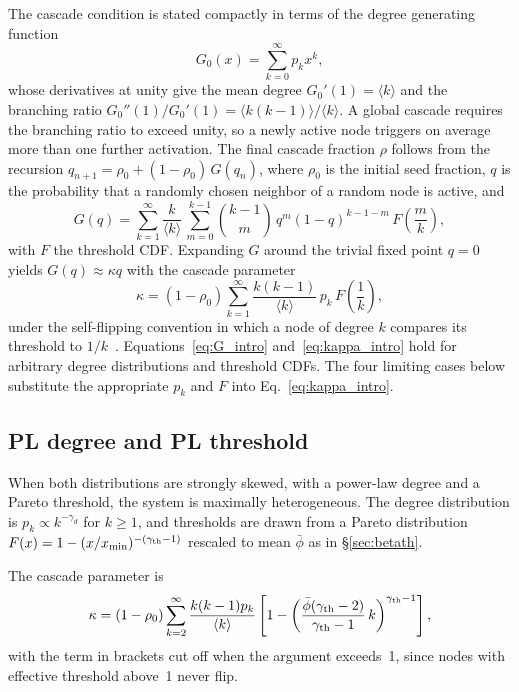 \documentclass[]{revtex4-2}
\begin{document}
The cascade condition is stated compactly in terms of the degree generating function
\begin{equation}
    G_0(x) = \sum_{k=0}^{\infty} p_k x^k,
    \label{eq:G0}
\end{equation}
whose derivatives at unity give the mean degree $G_0'(1)=\langle k\rangle$ and the branching ratio $G_0''(1)/G_0'(1)=\langle k(k-1)\rangle/\langle k\rangle$. A global cascade requires the branching ratio to exceed unity, so a newly active node triggers on average more than one further activation. The final cascade fraction $\rho$ follows from the recursion $q_{n+1}=\rho_0+(1-\rho_0)\,G(q_n)$, where $\rho_0$ is the initial seed fraction, $q$ is the probability that a randomly chosen neighbor of a random node is active, and
\begin{equation}
    G(q) = \sum_{k=1}^{\infty} \frac{k}{\langle k\rangle}\,
    \sum_{m=0}^{k-1} \binom{k-1}{m}\, q^m(1-q)^{k-1-m}\, F\!\left(\frac{m}{k}\right),
    \label{eq:G_intro}
\end{equation}
with $F$ the threshold CDF. Expanding $G$ around the trivial fixed point $q=0$ yields $G(q)\approx\kappa q$ with the cascade parameter
\begin{equation}
    \kappa = (1-\rho_0)\sum_{k=1}^{\infty} \frac{k(k-1)}{\langle k\rangle}\, p_k\, F\!\left(\frac{1}{k}\right),
    \label{eq:kappa_intro}
\end{equation}
under the self-flipping convention in which a node of degree $k$ compares its threshold to $1/k$~\citep{GleesonCahalane2007}. Equations~\eqref{eq:G_intro} and~\eqref{eq:kappa_intro} hold for arbitrary degree distributions and threshold CDFs. The four limiting cases below substitute the appropriate $p_k$ and $F$ into Eq.~\eqref{eq:kappa_intro}.

\subsection{PL degree and PL threshold}
\label{sec:pl-pl}

When both distributions are strongly skewed, with a power-law degree and a Pareto threshold, the system is maximally heterogeneous. The degree distribution is $p_k \propto k^{-\gamma_d}$ for $k\ge1$, and thresholds are drawn from a Pareto distribution $F(x) = 1 - (x/x_{\min})^{-(\gamma_{\rm th}-1)}$ rescaled to mean $\bar\phi$ as in \S\ref{sec:betath}.

The cascade parameter is
\begin{equation}
    \kappa = (1-\rho_0)\sum_{k=2}^\infty \frac{k(k-1)p_k}{\langle k\rangle}
    \left[1 - \left(\frac{\bar\phi(\gamma_{\rm th}-2)}{\gamma_{\rm th}-1}\,k\right)^{\gamma_{\rm th}-1}\right] ,
\end{equation}
with the term in brackets cut off when the argument exceeds~1, since nodes with effective threshold above~1 never flip.
\end{document}
